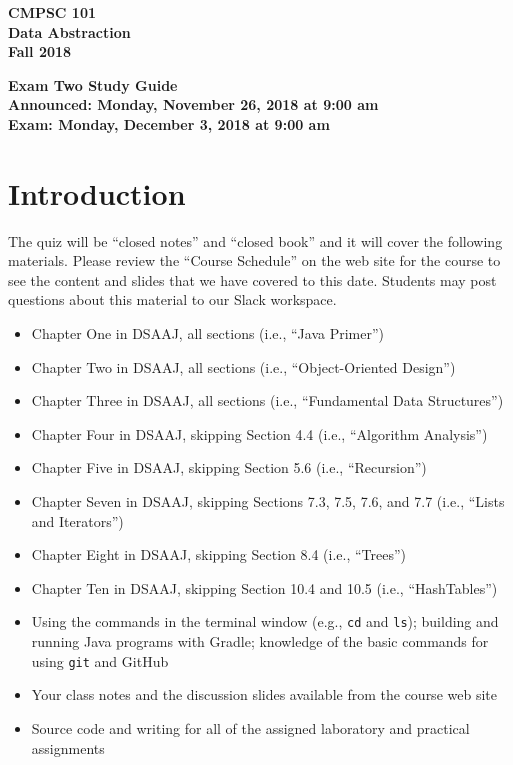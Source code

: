 \documentclass[11pt]{article}
\newcommand{\assignmentduedate}{December 3}
\newcommand{\assignmentassignedate}{November 26}
\newcommand{\assignmentnumber}{Two}
\newcommand{\labyear}{2018}
\newcommand{\assignedday}{Monday}
\newcommand{\dueday}{Monday}
\newcommand{\assignedtime}{9:00 am}
\newcommand{\labtime}{9:00 am}
\newcommand{\assigneddate}{Announced: \assignedday, \assignmentassignedate, \labyear{} at \assignedtime{}}
\newcommand{\duedate}{Exam: \dueday, \assignmentduedate, \labyear{} at \labtime{}}
\newcommand{\program}[1]{\lstinline{#1}}
\newcommand{\guidetitle}[1]
{
  \begin{center}
    \begin{center}
      \bf
      CMPSC 101\\Data Abstraction\\
      Fall 2018\\
      \medskip
    \end{center}
    \bf
    #1
  \end{center}
}
\begin{document}
\thispagestyle{empty}

\guidetitle{Exam \assignmentnumber{} Study Guide \\ \assigneddate{} \\ \duedate{}}

\section*{Introduction}

\noindent
The quiz will be ``closed notes'' and ``closed book'' and it will cover the
following materials. Please review the ``Course Schedule'' on the web site for
the course to see the content and slides that we have covered to this date.
Students may post questions about this material to our Slack workspace.

\begin{itemize}

  \itemsep 0in

  \item Chapter One in DSAAJ, all sections (i.e., ``Java Primer'')

  \item Chapter Two in DSAAJ, all sections (i.e., ``Object-Oriented Design'')

  \item Chapter Three in DSAAJ, all sections (i.e., ``Fundamental Data Structures'')

  \item Chapter Four in DSAAJ, skipping Section 4.4 (i.e., ``Algorithm Analysis'')

  \item Chapter Five in DSAAJ, skipping Section 5.6 (i.e., ``Recursion'')

  \item Chapter Seven in DSAAJ, skipping Sections 7.3, 7.5, 7.6, and 7.7 (i.e.,
    ``Lists and Iterators'')

  \item Chapter Eight in DSAAJ, skipping Section 8.4 (i.e., ``Trees'')

  \item Chapter Ten in DSAAJ, skipping Section 10.4 and 10.5 (i.e., ``HashTables'')

  \item Using the commands in the terminal window (e.g., \program{cd} and
    \program{ls}); building and running Java programs with Gradle; knowledge of
    the basic commands for using \program{git} and GitHub

  \item Your class notes and the discussion slides available from the course web
    site

  \item Source code and writing for all of the assigned laboratory and practical
    assignments

\end{itemize}
\end{document}

